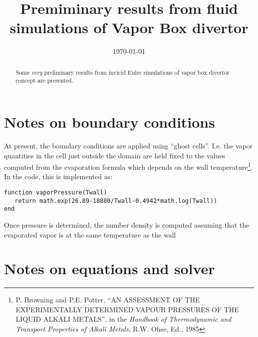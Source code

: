 \documentclass{tufte-handout}
\title{Premiminary results from fluid simulations of Vapor Box divertor}
\date{\today}%
\begin{document}
\maketitle

\begin{abstract}
  \noindent Some \emph{very} preliminary results from invicid Euler
  simulations of vapor box divertor concept are presented.
\end{abstract}

\section{Notes on boundary conditions}

At present, the boundary conditions are applied using ``ghost
cells''. I.e. the vapor quantities in the cell just outside the domain
are held fixed to the values computed from the evaporation formula
which depends on the wall temperature\footnote{P. Browning and
  P.E. Potter, ``AN ASSESSMENT OF THE EXPERIMENTALLY DETERMINED VAPOUR
  PRESSURES OF THE LIQUID ALKALI METALS'', in the \emph{Handbook of
    Thermodynamic and Transport Properties of Alkali Metals},
  R.W. Ohse, Ed., 1985}. In the code, this is implemented as:
\begin{verbatim}
function vaporPressure(Twall)
   return math.exp(26.89-18880/Twall-0.4942*math.log(Twall))
end
\end{verbatim}
Once pressure is determined, the number density is computed assuming
that the evaporated vapor is at the same temperature as the wall

\section{Notes on equations and solver}
\end{document}
